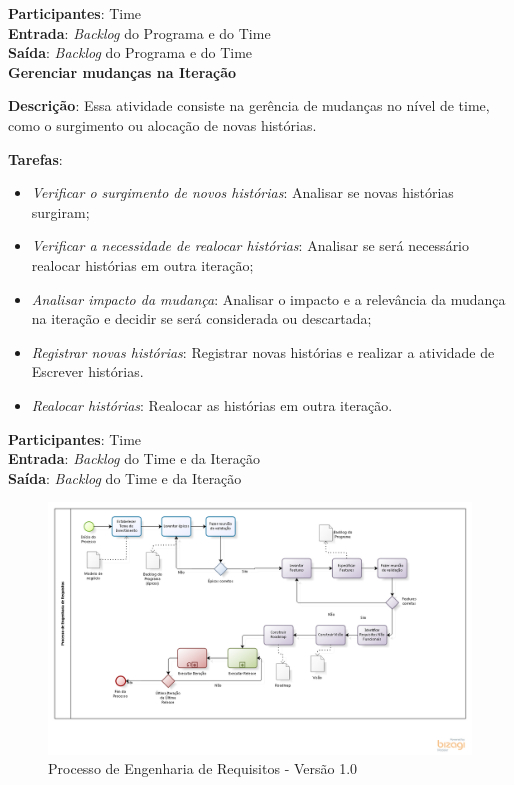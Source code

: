   \textbf{Participantes}: Time\\

  \textbf{Entrada}: \textit{Backlog} do Programa e do Time \\

  \textbf{Saída}:  \textit{Backlog} do Programa e do Time \\
  

\textbf{Gerenciar mudanças na Iteração}

  \textbf{Descrição}: Essa atividade consiste na gerência de mudanças no nível de time, como o surgimento ou alocação de novas histórias.

  \textbf{Tarefas}:
  \begin{itemize}
   \item \indent \textit{Verificar o surgimento de novos histórias}: Analisar se novas histórias surgiram;

   \item \indent \textit{Verificar a necessidade de realocar histórias}: Analisar se será necessário realocar histórias em outra iteração;
   
   \item \indent \textit{Analisar impacto da mudança}: Analisar o impacto e a relevância da mudança na iteração e decidir se será considerada
   ou descartada;

   \item \indent \textit{Registrar novas histórias}: Registrar novas histórias e realizar a atividade de Escrever histórias.

   \item \indent \textit{Realocar histórias}: Realocar as histórias em outra iteração.
  \end{itemize}

  \textbf{Participantes}: Time\\

  \textbf{Entrada}: \textit{Backlog} do Time e da Iteração\\

  \textbf{Saída}:  \textit{Backlog} do Time e da Iteração\\
  
\begin{figure}[!htb]
\flushleft
\includegraphics[scale=0.5]{figuras/processo1.png}
\caption{Processo de Engenharia de Requisitos - Versão 1.0}
\label{fig:Processo1}
\end{figure}

